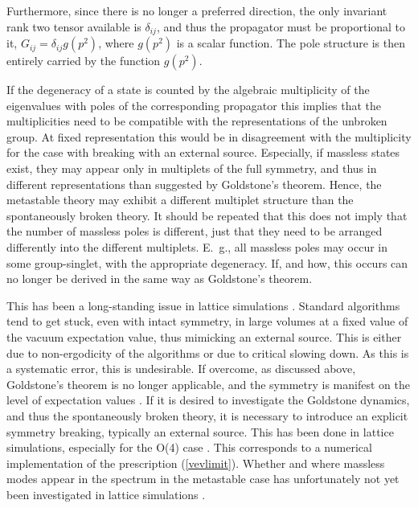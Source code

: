 \documentclass[final,12pt]{article}
\newcommand*{\pref}[1]{(\ref{#1})}
\newcommand*{\1}{1\!\!\!\bot}
\begin{document}
Furthermore, since there is no longer a preferred direction, the only invariant rank two tensor available is $\delta_{ij}$, and thus the propagator must be proportional to it, $G_{ij}=\delta_{ij}g(p^2)$, where $g(p^2)$ is a scalar function. The pole structure is then entirely carried by the function $g(p^2)$.

If the degeneracy of a state is counted by the algebraic multiplicity of the eigenvalues with poles of the corresponding propagator this implies that the multiplicities need to be compatible with the representations of the unbroken group. At fixed representation this would be in disagreement with the multiplicity for the case with breaking with an external source. Especially, if massless states exist, they may appear only in multiplets of the full symmetry, and thus in different representations than suggested by Goldstone's theorem. Hence, the metastable theory may exhibit a different multiplet structure than the spontaneously broken theory. It should be repeated that this does not imply that the number of massless poles is different, just that they need to be arranged differently into the different multiplets. E.\ g., all massless poles may occur in some group-singlet, with the appropriate degeneracy. If, and how, this occurs can no longer be derived in the same way as Goldstone's theorem. 

This has been a long-standing issue in lattice simulations \cite{Lang:pc}. Standard algorithms tend to get stuck, even with intact symmetry, in large volumes at a fixed value of the vacuum expectation value, thus mimicking an external source. This is either due to non-ergodicity of the algorithms or due to critical slowing down. As this is a systematic error, this is undesirable. If overcome, as discussed above, Goldstone's theorem is no longer applicable, and the symmetry is manifest on the level of expectation values \cite{Lang:pc,Neuberger:1987kt}. If it is desired to investigate the Goldstone dynamics, and thus the spontaneously broken theory, it is necessary to introduce an explicit symmetry breaking, typically an external source. This has been done in lattice simulations, especially for the O(4) case \cite{Luscher:1987ek,Hasenfratz:1988kr,Luscher:1988gc,Hasenfratz:1989ux,Hasenfratz:1990fu,Gockeler:1991sj,Gockeler:1994rx}. This corresponds to a numerical implementation of the prescription \pref{vevlimit}. Whether and where massless modes appear in the spectrum in the metastable case has unfortunately not yet been investigated in lattice simulations \cite{Lang:pc}.
\end{document}

